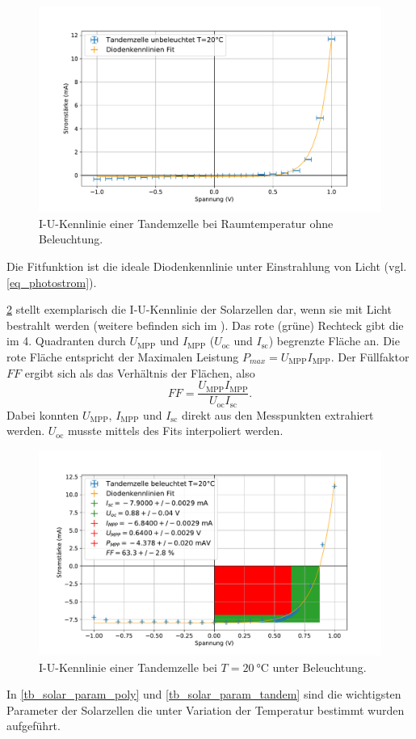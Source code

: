 \documentclass[
	a4paper,
	12pt,
	pagesize,
	ngerman
]{scrartcl}
\begin{document}
	\begin{figure}[H]
			\includegraphics[width=.9\linewidth]{img/Tandemzelle_unbeleuchtet_20.pdf}
			\caption{
				I-U-Kennlinie einer Tandemzelle bei Raumtemperatur ohne Beleuchtung.
								}
			\label{fig_tandem_unbeleuchtet_20}
	\end{figure}

	Die Fitfunktion ist die ideale Diodenkennlinie unter Einstrahlung von Licht (vgl. \cref{eq_photostrom}).

	\cref{fig_tandem_beleuchtet_20} stellt exemplarisch die I-U-Kennlinie der Solarzellen dar, wenn sie mit Licht bestrahlt werden (weitere befinden sich im ).
	Das rote (grüne) Rechteck gibt die im 4. Quadranten durch $U_\text{MPP}$ und $I_\text{MPP}$ ($U_\text{oc}$ und $I_\text{sc}$) begrenzte Fläche an.
	Die rote Fläche entspricht der Maximalen Leistung $P_{max} = U_\text{MPP}I_\text{MPP}$.
	Der Füllfaktor $FF$ ergibt sich als das Verhältnis der Flächen, also
	\begin{equation}
		FF = \frac{U_\text{MPP}I_\text{MPP}}{U_\text{oc}I_\text{sc}}.
	\end{equation}
	Dabei konnten $U_\text{MPP}$, $I_\text{MPP}$ und $I_\text{sc}$ direkt aus den Messpunkten extrahiert werden.
	$U_\text{oc}$ musste mittels des Fits interpoliert werden.


	\begin{figure}[H]
			\includegraphics[width=.9\linewidth]{img/Tandemzelle_beleuchtet_20.pdf}
			\caption{
				I-U-Kennlinie einer Tandemzelle bei $T=\SI{20}{\celsius}$ unter Beleuchtung.
								}
			\label{fig_tandem_beleuchtet_20}
	\end{figure}
	In \cref{tb_solar_param_poly} und \cref{tb_solar_param_tandem} sind die wichtigsten Parameter der Solarzellen die unter Variation der Temperatur bestimmt wurden aufgeführt.
\end{document}

